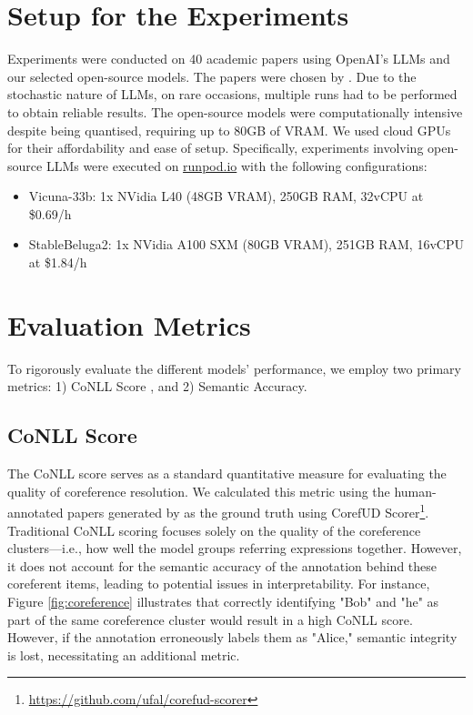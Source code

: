 \section{Setup for the Experiments}

Experiments were conducted on 40 academic papers using OpenAI's LLMs and our selected open-source models. The papers were chosen by \citet{asakura2022building}. Due to the stochastic nature of LLMs, on rare occasions, multiple runs had to be performed to obtain reliable results. The open-source models were computationally intensive despite being quantised, requiring up to 80GB of \ac{VRAM}. We used cloud \ac{GPU}s for their affordability and ease of setup. Specifically, experiments involving open-source LLMs were executed on \href{https://runpod.io}{runpod.io} with the following configurations:

\begin{itemize}
    \item Vicuna-33b: 1x NVidia L40 (48GB VRAM), 250GB RAM, 32vCPU at \$0.69/h
    \item StableBeluga2: 1x NVidia A100 SXM (80GB VRAM), 251GB RAM, 16vCPU at \$1.84/h
\end{itemize}

\section{Evaluation Metrics}

To rigorously evaluate the different models' performance, we employ two primary metrics: 1) CoNLL Score \citep{pradhan2012conll}, and 2) Semantic Accuracy.

\subsection{CoNLL Score}
The CoNLL score serves as a standard quantitative measure for evaluating the quality of coreference resolution. We calculated this metric using the human-annotated papers generated by \citet{asakura2022building} as the ground truth using CorefUD Scorer\footnote{\url{https://github.com/ufal/corefud-scorer}}. Traditional CoNLL scoring focuses solely on the quality of the coreference clusters—i.e., how well the model groups referring expressions together. However, it does not account for the semantic accuracy of the annotation behind these coreferent items, leading to potential issues in interpretability. For instance, Figure \ref{fig:coreference} illustrates that correctly identifying "Bob" and "he" as part of the same coreference cluster would result in a high CoNLL score. However, if the annotation erroneously labels them as "Alice," semantic integrity is lost, necessitating an additional metric.

